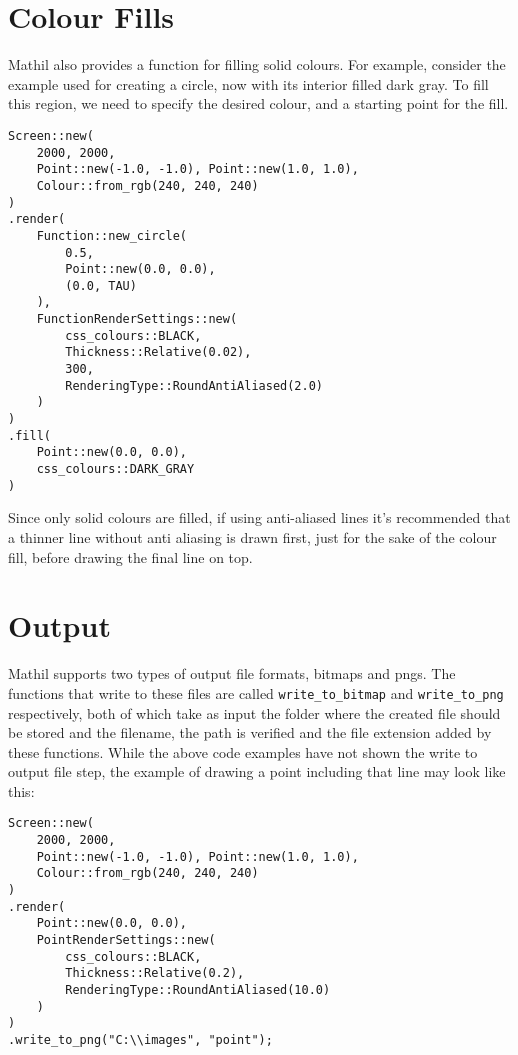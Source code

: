 
\section{Colour Fills}

Mathil also provides a function for filling solid colours. For example, consider the example used for creating a circle, now with its interior filled dark gray. To fill this region, we need to specify the desired colour, and a starting point for the fill.

\begin{lstlisting}
Screen::new(
    2000, 2000,
    Point::new(-1.0, -1.0), Point::new(1.0, 1.0),
    Colour::from_rgb(240, 240, 240)
)
.render(
    Function::new_circle(
        0.5,
        Point::new(0.0, 0.0),
        (0.0, TAU)
    ),
    FunctionRenderSettings::new(
        css_colours::BLACK,
        Thickness::Relative(0.02),
        300,
        RenderingType::RoundAntiAliased(2.0)
    )
)
.fill(
    Point::new(0.0, 0.0),
    css_colours::DARK_GRAY
)
\end{lstlisting}


Since only solid colours are filled, if using anti-aliased lines it's recommended that a thinner line without anti aliasing is drawn first, just for the sake of the colour fill, before drawing the final line on top.

\section{Output}

Mathil supports two types of output file formats, bitmaps and pngs. The functions that write to these files are called \verb|write_to_bitmap| and \verb|write_to_png| respectively, both of which take as input the folder where the created file should be stored and the filename, the path is verified and the file extension added by these functions. While the above code examples have not shown the write to output file step, the example of drawing a point including that line may look like this:

\begin{lstlisting}
Screen::new(
    2000, 2000,
    Point::new(-1.0, -1.0), Point::new(1.0, 1.0),
    Colour::from_rgb(240, 240, 240)
)
.render(
    Point::new(0.0, 0.0),
    PointRenderSettings::new(
        css_colours::BLACK,
        Thickness::Relative(0.2),
        RenderingType::RoundAntiAliased(10.0)
    )
)
.write_to_png("C:\\images", "point");
\end{lstlisting}


